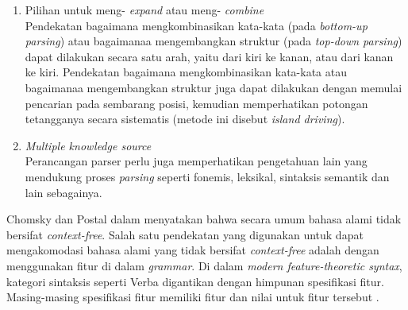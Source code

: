 \begin{enumerate}
	\item Pilihan untuk meng- \emph{expand} atau meng- \emph{combine}\\
	Pendekatan bagaimana mengkombinasikan kata-kata (pada \emph{bottom-up parsing}) atau bagaimanaa mengembangkan struktur (pada \emph{top-down parsing}) dapat dilakukan secara satu arah, yaitu dari kiri ke kanan, atau dari kanan ke kiri. Pendekatan bagaimana mengkombinasikan kata-kata atau bagaimanaa mengembangkan struktur juga dapat dilakukan dengan memulai pencarian pada sembarang posisi, kemudian memperhatikan potongan tetangganya secara sistematis (metode ini disebut \emph{island driving}).

	\item \emph{Multiple knowledge source}\\
	Perancangan parser perlu juga memperhatikan pengetahuan lain yang mendukung proses \emph{parsing} seperti fonemis, leksikal, sintaksis semantik dan lain sebagainya.
\end{enumerate}

Chomsky dan Postal dalam \citet{bar_feigenbaum} menyatakan bahwa secara umum bahasa alami tidak bersifat \emph{context-free}. Salah satu pendekatan yang digunakan untuk dapat mengakomodasi bahasa alami yang tidak bersifat \emph{context-free} adalah dengan menggunakan fitur di dalam \emph{grammar}. Di dalam \emph{modern feature-theoretic syntax}, kategori sintaksis seperti Verba digantikan dengan himpunan spesifikasi fitur. Masing-masing spesifikasi fitur memiliki fitur dan nilai untuk fitur tersebut \citep{gazdar_mellish}.